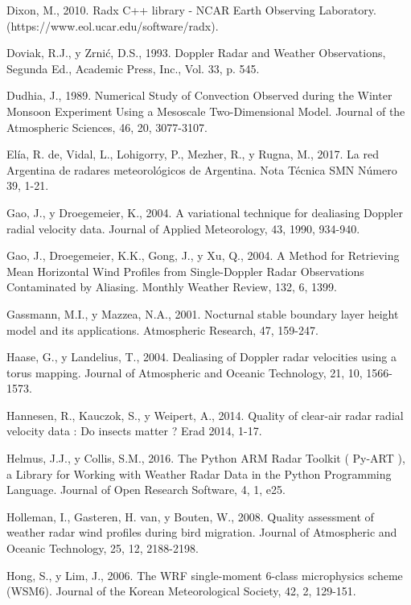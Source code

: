 \documentclass[12pt,spanish,oneside]{book}
\begin{document}
\hypertarget{ref-Dixon2010}{}
Dixon, M., 2010. Radx C++ library - NCAR Earth Observing Laboratory.
(https://www.eol.ucar.edu/software/radx).

\hypertarget{ref-Doviak1993}{}
Doviak, R.J., y Zrnić, D.S., 1993. Doppler Radar and Weather
Observations, Segunda Ed., Academic Press, Inc., Vol. 33, p. 545.

\hypertarget{ref-Dudhia1989}{}
Dudhia, J., 1989. Numerical Study of Convection Observed during the
Winter Monsoon Experiment Using a Mesoscale Two-Dimensional Model.
Journal of the Atmospheric Sciences, 46, 20, 3077-3107.

\hypertarget{ref-DeElia2017}{}
Elía, R. de, Vidal, L., Lohigorry, P., Mezher, R., y Rugna, M., 2017. La
red Argentina de radares meteorológicos de Argentina. Nota Técnica SMN
Número 39, 1-21.

\hypertarget{ref-Gao2004}{}
Gao, J., y Droegemeier, K., 2004. A variational technique for dealiasing
Doppler radial velocity data. Journal of Applied Meteorology, 43, 1990,
934-940.

\hypertarget{ref-Gao2004a}{}
Gao, J., Droegemeier, K.K., Gong, J., y Xu, Q., 2004. A Method for
Retrieving Mean Horizontal Wind Profiles from Single-Doppler Radar
Observations Contaminated by Aliasing. Monthly Weather Review, 132, 6,
1399.

\hypertarget{ref-Gassmann2001}{}
Gassmann, M.I., y Mazzea, N.A., 2001. Nocturnal stable boundary layer
height model and its applications. Atmospheric Research, 47, 159-247.

\hypertarget{ref-Haase2004}{}
Haase, G., y Landelius, T., 2004. Dealiasing of Doppler radar velocities
using a torus mapping. Journal of Atmospheric and Oceanic Technology,
21, 10, 1566-1573.

\hypertarget{ref-Hannesen2014}{}
Hannesen, R., Kauczok, S., y Weipert, A., 2014. Quality of clear-air
radar radial velocity data : Do insects matter ? Erad 2014, 1-17.

\hypertarget{ref-Helmus2016}{}
Helmus, J.J., y Collis, S.M., 2016. The Python ARM Radar Toolkit (
Py-ART ), a Library for Working with Weather Radar Data in the Python
Programming Language. Journal of Open Research Software, 4, 1, e25.

\hypertarget{ref-Holleman2008}{}
Holleman, I., Gasteren, H. van, y Bouten, W., 2008. Quality assessment
of weather radar wind profiles during bird migration. Journal of
Atmospheric and Oceanic Technology, 25, 12, 2188-2198.

\hypertarget{ref-Hong2006a}{}
Hong, S., y Lim, J., 2006. The WRF single-moment 6-class microphysics
scheme (WSM6). Journal of the Korean Meteorological Society, 42, 2,
129-151.
\end{document}

